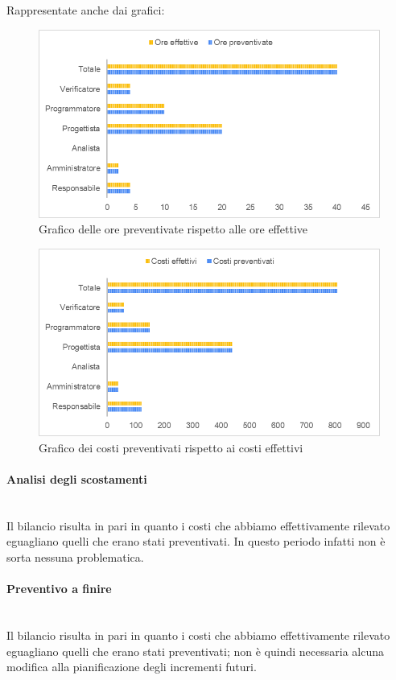 Rappresentate anche dai grafici:
\begin{figure} [H]
	\includegraphics[width=\linewidth]{./img/Grafici/35.png}
	\caption{Grafico delle ore preventivate rispetto alle ore effettive}
\end{figure}

\begin{figure} [H]
	\includegraphics[width=\linewidth]{./img/Grafici/36.png}
	\caption{Grafico dei costi preventivati rispetto ai costi effettivi}
\end{figure}

\paragraph*{Analisi degli scostamenti} \mbox{} \\
Il bilancio risulta in pari in quanto i costi che abbiamo effettivamente rilevato eguagliano quelli che erano stati preventivati. In questo periodo infatti non è sorta nessuna problematica.


\paragraph*{Preventivo a finire} \mbox{} \\
Il bilancio risulta in pari in quanto i costi che abbiamo effettivamente rilevato eguagliano quelli che erano stati preventivati; non è quindi necessaria alcuna modifica alla pianificazione degli incrementi futuri.



